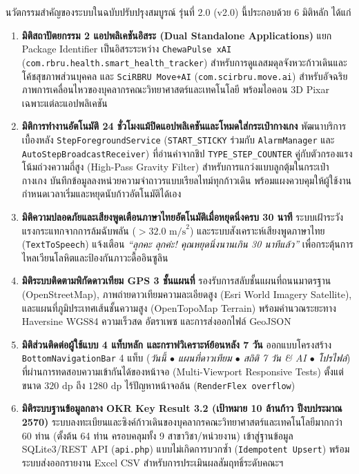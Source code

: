 นวัตกรรมสำคัญของระบบในฉบับปรับปรุงสมบูรณ์ รุ่นที่ 2.0 (v2.0) นี้ประกอบด้วย 6 มิติหลัก ได้แก่
\begin{enumerate}[label=\textbf{\arabic*.}]
  \item \textbf{มิติสถาปัตยกรรม 2 แอปพลิเคชันอิสระ (Dual Standalone Applications)} แยก Package Identifier เป็นอิสระระหว่าง \texttt{ChewaPulse xAI} (\texttt{com.rbru.health.smart\_health\_tracker}) สำหรับการดูแลสมดุลจังหวะก้าวเดินและโค้ชสุขภาพส่วนบุคคล และ \texttt{SciRBRU Move+AI} (\texttt{com.scirbru.move.ai}) สำหรับอัจฉริยภาพการเคลื่อนไหวของบุคลากรคณะวิทยาศาสตร์และเทคโนโลยี พร้อมไอคอน 3D Pixar เฉพาะแต่ละแอปพลิเคชัน
  \item \textbf{มิติการทำงานอัตโนมัติ 24 ชั่วโมงแม้ปิดแอปพลิเคชันและโหมดใส่กระเป๋ากางเกง} พัฒนาบริการเบื้องหลัง \texttt{StepForegroundService} (\texttt{START\_STICKY} ร่วมกับ \texttt{AlarmManager} และ \texttt{AutoStepBroadcastReceiver}) ที่อ่านค่าจากชิป \texttt{TYPE\_STEP\_COUNTER} คู่กับตัวกรองแรงโน้มถ่วงความถี่สูง (High-Pass Gravity Filter) สำหรับการแกว่งแบบลูกตุ้มในกระเป๋ากางเกง บันทึกข้อมูลลงหน่วยความจำถาวรแบบเรียลไทม์ทุกก้าวเดิน พร้อมแผงควบคุมให้ผู้ใช้งานกำหนดเวลาเริ่มและหยุดนับก้าวอัตโนมัติได้เอง
  \item \textbf{มิติความปลอดภัยและเสียงพูดเตือนภาษาไทยอัตโนมัติเมื่อหยุดนิ่งครบ 30 นาที} ระบบเฝ้าระวังแรงกระแทกจากการล้มฉับพลัน ($> 32.0\text{ m/s}^2$) และระบบสังเคราะห์เสียงพูดภาษาไทย (\texttt{TextToSpeech}) แจ้งเตือน \textit{``ลุกคะ ลุกค่ะ! คุณหยุดนิ่งนานเกิน 30 นาทีแล้ว''} เพื่อกระตุ้นการไหลเวียนโลหิตและป้องกันภาวะดื้ออินซูลิน
  \item \textbf{มิติระบบติดตามพิกัดดาวเทียม GPS 3 ชั้นแผนที่} รองรับการสลับชั้นแผนที่ถนนมาตรฐาน (OpenStreetMap), ภาพถ่ายดาวเทียมความละเอียดสูง (Esri World Imagery Satellite), และแผนที่ภูมิประเทศเส้นชั้นความสูง (OpenTopoMap Terrain) พร้อมคำนวณระยะทาง Haversine WGS84 ความเร็วสด อัตราเพซ และการส่งออกไฟล์ GeoJSON
  \item \textbf{มิติส่วนติดต่อผู้ใช้แบบ 4 แท็บหลัก และกราฟวิเคราะห์ย้อนหลัง 7 วัน} ออกแบบโครงสร้าง \texttt{BottomNavigationBar} 4 แท็บ (\textit{วันนี้ $\bullet$ แผนที่ดาวเทียม $\bullet$ สถิติ 7 วัน \& AI $\bullet$ โปรไฟล์}) ที่ผ่านการทดสอบความเข้ากันได้ของหน้าจอ (Multi-Viewport Responsive Tests) ตั้งแต่ขนาด $320\text{ dp}$ ถึง $1280\text{ dp}$ ไร้ปัญหาหน้าจอล้น (\texttt{RenderFlex overflow})
  \item \textbf{มิติระบบฐานข้อมูลกลาง OKR Key Result 3.2 (เป้าหมาย 10 ล้านก้าว ปีงบประมาณ 2570)} ระบบลงทะเบียนและซิงค์ก้าวเดินของบุคลากรคณะวิทยาศาสตร์และเทคโนโลยีมากกว่า 60 ท่าน (ตั้งต้น 64 ท่าน ครอบคลุมทั้ง 9 สาขาวิชา/หน่วยงาน) เข้าสู่ฐานข้อมูล SQLite3/REST API (\texttt{api.php}) แบบไม่เกิดการบวกซ้ำ (\texttt{Idempotent Upsert}) พร้อมระบบส่งออกรายงาน Excel CSV สำหรับการประเมินผลสัมฤทธิ์ระดับคณะฯ
\end{enumerate}

